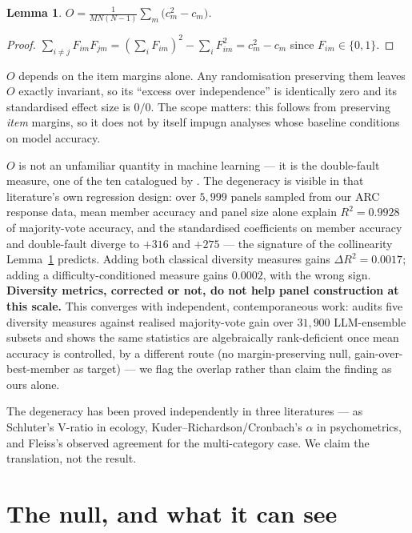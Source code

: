 \documentclass[10pt,letterpaper]{article}
\newtheorem{lemma}{Lemma}
\begin{document}
\begin{lemma}\label{lem:mean}
$\displaystyle O=\frac{1}{MN(N-1)}\sum_m\bigl(c_m^2-c_m\bigr)$.
\end{lemma}
\begin{proof}
$\sum_{i\neq j}F_{im}F_{jm}=(\sum_i F_{im})^2-\sum_i F_{im}^2=c_m^2-c_m$ since $F_{im}\in\{0,1\}$.
\end{proof}

$O$ depends on the item margins alone. Any randomisation preserving them leaves $O$ exactly
invariant, so its ``excess over independence'' is identically zero and its standardised effect
size is $0/0$. The scope matters: this follows from preserving \emph{item} margins, so it does not
by itself impugn analyses whose baseline conditions on model accuracy.

$O$ is not an unfamiliar quantity in machine learning --- it is the double-fault measure, one of
the ten catalogued by \citet{kuncheva2003}. The degeneracy is visible in that literature's own
regression design: over $5{,}999$ panels sampled from our ARC response data, mean member accuracy
and panel size alone explain $R^2=0.9928$ of majority-vote accuracy, and the standardised
coefficients on member accuracy and double-fault diverge to $+316$ and $+275$ --- the signature of
the collinearity Lemma~\ref{lem:mean} predicts. Adding both classical diversity measures gains
$\Delta R^2=0.0017$; adding a difficulty-conditioned measure gains $0.0002$, with the wrong sign.
\textbf{Diversity metrics, corrected or not, do not help panel construction at this scale.} This
converges with independent, contemporaneous work: \citet{kim2026diversity} audits five diversity
measures against realised majority-vote gain over $31{,}900$ LLM-ensemble subsets and shows the
same statistics are algebraically rank-deficient once mean accuracy is controlled, by a different
route (no margin-preserving null, gain-over-best-member as target) --- we flag the overlap rather
than claim the finding as ours alone.

The degeneracy has been proved independently in three literatures --- as Schluter's V-ratio in
ecology, Kuder--Richardson/Cronbach's $\alpha$ in psychometrics, and Fleiss's observed agreement
for the multi-category case. We claim the translation, not the result.

\section{The null, and what it can see}
\end{document}
